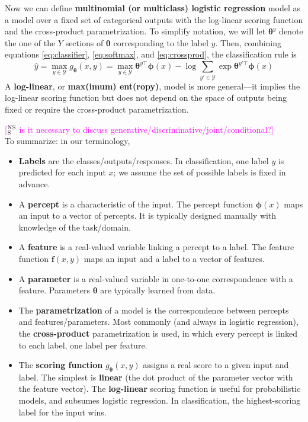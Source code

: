 \documentclass[11pt,letterpaper]{article}
\newcommand{\ensuretext}[1]{#1}
\newcommand{\nssmarker}{\ensuretext{\textcolor{magenta}{\ensuremath{^{\textsc{NS}}_{\textsc{S}}}}}}
\newcommand{\arkcomment}[3]{\ensuretext{\textcolor{#3}{[#1 #2]}}}
\newcommand{\nss}[1]{\arkcomment{\nssmarker}{#1}{magenta}}
\newcommand{\params}{\mathbf{\theta}}
\newcommand{\eref}[1]{\eqref{#1}}
\begin{document}
Now we can define {\bf multinomial (or multiclass) logistic regression} model 
as a model over a fixed set of categorical outputs with the log-linear scoring function and the cross-product parametrization.
To simplify notation, we will let $\boldsymbol{\theta}^y$ denote the one of the $Y$ sections of $\boldsymbol{\theta}$ 
corresponding to the label $y$. 
Then, combining equations \eref{eq:classifier}, \eref{eq:softmax}, and \eref{eq:crossprod}, 
the classification rule is
\begin{equation}\label{eq:logistic}
\hat{y} = \max_{y\in\mathcal{Y}} g_\params(x,y) = \max_{y\in\mathcal{Y}} \boldsymbol{\theta}^{y\top} \boldsymbol{\phi}(x) - \log{\sum_{y'\in\mathcal{Y}}{\exp{\boldsymbol{\theta}^{y'\top} \boldsymbol{\phi}(x)}}}
\end{equation} 
A {\bf log-linear}, or {\bf max(imum) ent(ropy)}, model is more general---it implies the log-linear scoring function 
but does not depend on the space of outputs being fixed or require the cross-product parametrization.

\nss{is it necessary to discuss generative/discriminative/joint/conditional?}
\\

\noindent To summarize: in our terminology,
\begin{itemize}
  \item {\bf Labels} are the classes/outputs/responses. In classification, one label $y$ is predicted for each input $x$; 
  we assume the set of possible labels is fixed in advance.
  \item A {\bf percept} is a characteristic of the input. The percept function $\boldsymbol{\phi}(x)$ maps an input to a vector of percepts.
  It is typically designed manually with knowledge of the task/domain.
  \item A {\bf feature} is a real-valued variable linking a percept to a label. The feature function $\mathbf{f}(x,y)$ maps an input and a label to a vector of features.
  \item A {\bf parameter} is a real-valued variable in one-to-one correspondence with a feature. Parameters $\boldsymbol{\theta}$ are typically learned from data.
  \item The {\bf parametrization} of a model is the correspondence between percepts and features/parameters. 
  Most commonly (and always in logistic regression), the {\bf cross-product} parametrization is used, in which every percept is linked to each label, one label per feature.
  \item The {\bf scoring function} $g_{\boldsymbol{\theta}}(x,y)$ assigns a real score to a given input and label. 
  The simplest is {\bf linear} (the dot product of the parameter vector with the feature vector).
  The {\bf log-linear} scoring function is useful for probabilistic models, and subsumes logistic regression.
  In classification, the highest-scoring label for the input wins. 
\end{itemize}
\end{document}
